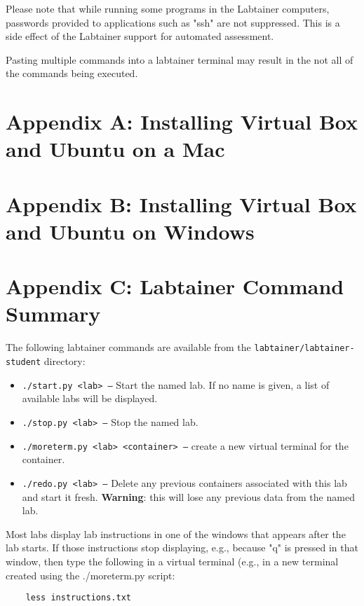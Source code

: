 \documentclass[12pt]{article}
\begin{document}
Please note that while running some programs in the Labtainer computers, passwords provided to
applications such as "ssh" are not suppressed.  This is a side effect of the Labtainer
support for automated assessment.  

Pasting multiple commands into a labtainer terminal may result in the not all of the
commands being executed.


\appendix 
\section {Appendix A: Installing Virtual Box and Ubuntu on a Mac}

\appendix 
\section {Appendix B: Installing Virtual Box and Ubuntu on Windows}

\appendix 
\section {Appendix C: Labtainer Command Summary}
\label{sec:appendixC}
The following labtainer commands are available from the \texttt{labtainer/labtainer-student}
directory:
\begin{itemize}
\item \texttt{./start.py <lab> --}
Start the named lab.  If no name is given, a list of available labs will be displayed.
\item \texttt{./stop.py <lab> --} Stop the named lab.
\item \texttt{./moreterm.py <lab> <container> --} create a new virtual terminal for the container.
\item \texttt{./redo.py <lab> --}
Delete any previous containers associated with this lab and start it fresh.  \textbf{Warning}: this will lose any
previous data from the named lab.
\end{itemize}

Most labs display lab instructions in one of the windows that appears after the lab starts.  If those instructions
stop displaying, e.g., because "q" is pressed in that window, then type the following in a virtual terminal (e.g.,
in a new terminal created using the ./moreterm.py script:
\begin{verbatim}
    less instructions.txt
\end{verbatim}
\end{document}
